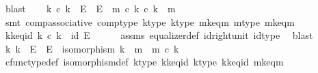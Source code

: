 \begin{isabellebody}
\ blast\isanewline
\isanewline
\ \ \isamarkupfalse%
\ {\isachardoublequoteopen}k{\isacharprime}{\kern0pt}\ {\isasymcirc}\isactrlsub c\ k\ {\isacharcolon}{\kern0pt}\ E{\isacharprime}{\kern0pt}\ {\isasymrightarrow}\ E{\isacharprime}{\kern0pt}\ {\isasymand}\ m{\isacharprime}{\kern0pt}\ {\isasymcirc}\isactrlsub c\ k{\isacharprime}{\kern0pt}\ {\isasymcirc}\isactrlsub c\ k\ {\isacharequal}{\kern0pt}\ m{\isacharprime}{\kern0pt}{\isachardoublequoteclose}\isanewline
\ \ \ \ \isamarkupfalse%
\ {\isacharparenleft}{\kern0pt}smt\ comp{\isacharunderscore}{\kern0pt}associative{}\ comp{\isacharunderscore}{\kern0pt}type\ k{\isacharprime}{\kern0pt}{\isacharunderscore}{\kern0pt}type\ k{\isacharunderscore}{\kern0pt}type\ m{\isacharprime}{\kern0pt}k{\isacharunderscore}{\kern0pt}eq{\isacharunderscore}{\kern0pt}m\ m{\isacharunderscore}{\kern0pt}type\ mk{\isacharunderscore}{\kern0pt}eq{\isacharunderscore}{\kern0pt}m{\isacharprime}{\kern0pt}{\isacharparenright}{\kern0pt}\isanewline
\ \ \isamarkupfalse%
\ \isamarkupfalse%
\ k{\isacharprime}{\kern0pt}k{\isacharunderscore}{\kern0pt}eq{\isacharunderscore}{\kern0pt}id{\isacharcolon}{\kern0pt}\ {\isachardoublequoteopen}k{\isacharprime}{\kern0pt}\ {\isasymcirc}\isactrlsub c\ k\ {\isacharequal}{\kern0pt}\ id\ E{\isacharprime}{\kern0pt}{\isachardoublequoteclose}\isanewline
\ \ \ \ \isamarkupfalse%
\ assms{\isacharparenleft}{\kern0pt}{}{\isacharparenright}{\kern0pt}\ equalizer{\isacharunderscore}{\kern0pt}def\ id{\isacharunderscore}{\kern0pt}right{\isacharunderscore}{\kern0pt}unit{}\ id{\isacharunderscore}{\kern0pt}type\ \isamarkupfalse%
\ blast\isanewline
\isanewline
\ \ \isamarkupfalse%
\ {\isachardoublequoteopen}{\isasymexists}k{\isachardot}{\kern0pt}\ k\ {\isacharcolon}{\kern0pt}\ E\ {\isasymrightarrow}\ E{\isacharprime}{\kern0pt}\ {\isasymand}\ isomorphism\ k\ {\isasymand}\ m\ {\isacharequal}{\kern0pt}\ m{\isacharprime}{\kern0pt}\ {\isasymcirc}\isactrlsub c\ k{\isachardoublequoteclose}\isanewline
\ \ \ \ \isamarkupfalse%
\ cfunc{\isacharunderscore}{\kern0pt}type{\isacharunderscore}{\kern0pt}def\ isomorphism{\isacharunderscore}{\kern0pt}def\ k{\isacharprime}{\kern0pt}{\isacharunderscore}{\kern0pt}type\ k{\isacharprime}{\kern0pt}k{\isacharunderscore}{\kern0pt}eq{\isacharunderscore}{\kern0pt}id\ k{\isacharunderscore}{\kern0pt}type\ kk{\isacharprime}{\kern0pt}{\isacharunderscore}{\kern0pt}eq{\isacharunderscore}{\kern0pt}id\ m{\isacharprime}{\kern0pt}k{\isacharunderscore}{\kern0pt}eq{\isacharunderscore}{\kern0pt}m\ \isamarkupfalse%

\end{isabellebody}
